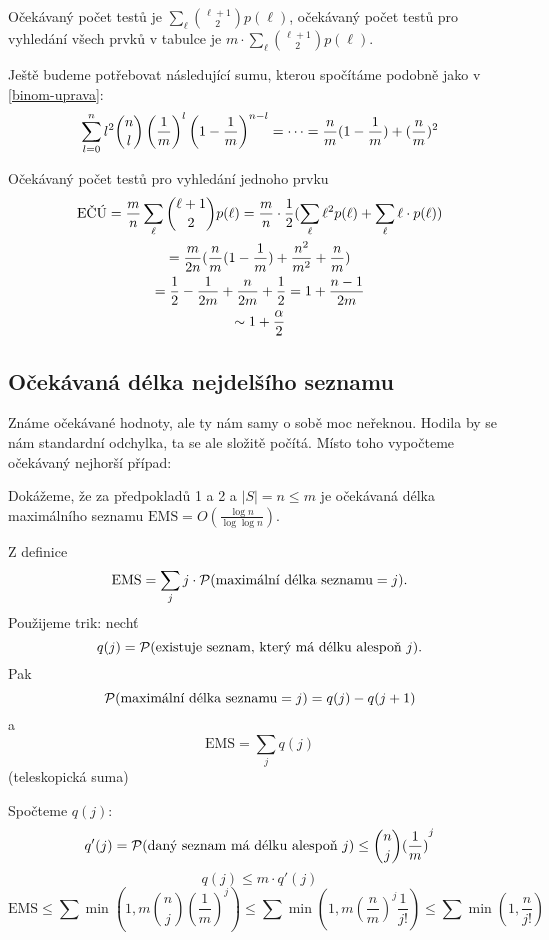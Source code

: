 \def\OcPocTst{\sum_\ell \binom{\ell+1}{2} p(\ell)}
Očekávaný počet testů je $ \OcPocTst $, 
očekávaný počet testů pro vyhledání všech prvků v tabulce je
$ m \cdot \OcPocTst $.

Ještě budeme potřebovat následující sumu, kterou spočítáme podobně
jako v \ref{binom-uprava}:
$$ \sum_{l=0}^n l^2 \binom{n}{l}\left(\frac{1}{m}\right)^{l}\left(1-\frac{1}{m}\right)^{n-l}
= \cdots =
\frac{n}{m} (1-\frac{1}{m}) + (\frac{n}{m})^2
$$

Očekávaný počet testů pro vyhledání jednoho prvku
\begin{multline}
\text{EČÚ}
= \frac{m}{n} \OcPocTst 
= \frac{m}{n} \cdot \frac{1}{2} ( \sum_\ell \ell^2 p(\ell) + \sum_\ell \ell \cdot p(\ell) )\\
= \frac{m}{2n} 
	( \frac{n}{m} (1-\invm)
	+ \frac{n^2}{m^2} 
	+ \frac{n}{m}
	)\\
= \frac{1}{2} - \frac{1}{2m} + \frac{n}{2m} + \frac{1}{2}
= 1 + \frac{n-1}{2m}\\
\sim 1 + \frac{\alpha}{2}
\end{multline}

\subsection{Očekávaná délka nejdelšího seznamu}

\begin{samepage}
Známe očekávané hodnoty, ale ty nám samy o sobě moc neřeknou. Hodila
by se nám standardní odchylka, ta se ale složitě počítá. Místo toho
vypočteme očekávaný nejhorší případ:

Dokážeme, že
za předpokladů 1 a 2 a $|S| = n \leq m$ je očekávaná délka maximálního
seznamu $\text{EMS} = O( \frac{\log n}{\log\log n} )$.
\end{samepage}

Z definice 
\[
\text{EMS} = \sum_j j \cdot {\cal P}(\text{maximální délka seznamu}=j). 
\]
Použijeme trik: nechť 
\[
q(j) = {\cal P}(\text{existuje seznam, který má délku alespoň }j). 
\]
Pak 
\[ {\cal P}(\text{maximální délka seznamu}=j) = q(j) - q(j+1) \]
a
\[
\text{EMS} = \sum_j q(j) 
\] (teleskopická suma) 

Spočteme $q(j)$:
\[
q'(j) 
= {\cal P}( \text{daný seznam má délku alespoň }j ) 
\leq \binom nj {(\frac 1m)}^j
\]
\[
q(j) \leq m \cdot q'(j)
\]
\[
\text{EMS}
\leq \sum \min(1, m \binom nj {(\frac 1m)}^j )
\leq \sum \min(1, m {(\frac nm)}^j \frac 1{j!} )
\leq \sum \min(1, \frac n{j!} )
\]

